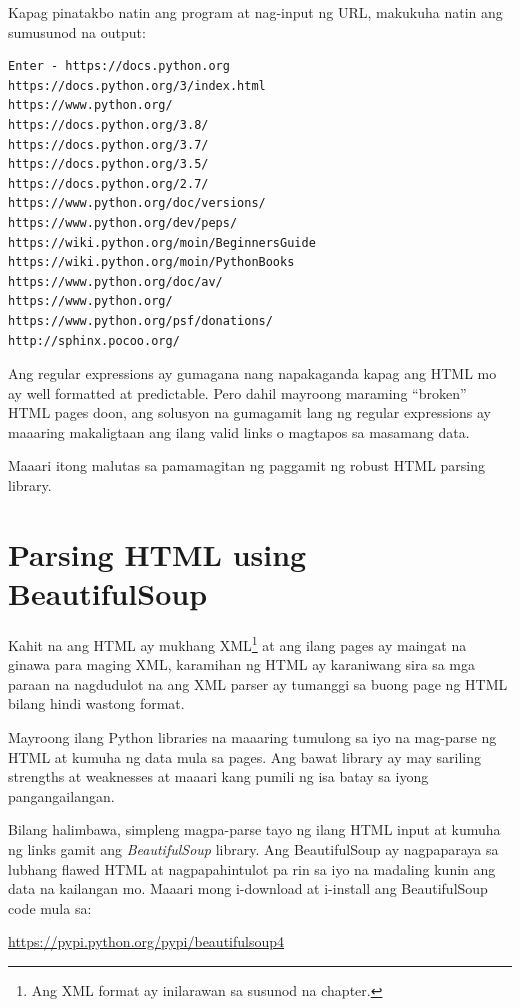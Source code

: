 \documentclass[10pt,]{book}
\begin{document}
Kapag pinatakbo natin ang program at nag-input ng URL, makukuha natin
ang sumusunod na output:

{\small
\begin{verbatim}
Enter - https://docs.python.org
https://docs.python.org/3/index.html
https://www.python.org/
https://docs.python.org/3.8/
https://docs.python.org/3.7/
https://docs.python.org/3.5/
https://docs.python.org/2.7/
https://www.python.org/doc/versions/
https://www.python.org/dev/peps/
https://wiki.python.org/moin/BeginnersGuide
https://wiki.python.org/moin/PythonBooks
https://www.python.org/doc/av/
https://www.python.org/
https://www.python.org/psf/donations/
http://sphinx.pocoo.org/
\end{verbatim}
}

Ang regular expressions ay gumagana nang napakaganda kapag ang HTML mo
ay well formatted at predictable. Pero dahil mayroong maraming
``broken'' HTML pages doon, ang solusyon na gumagamit lang ng regular
expressions ay maaaring makaligtaan ang ilang valid links o magtapos sa
masamang data.

Maaari itong malutas sa pamamagitan ng paggamit ng robust HTML parsing
library.

\section{Parsing HTML using
BeautifulSoup}\label{parsing-html-using-beautifulsoup}


Kahit na ang HTML ay mukhang XML\footnote{Ang XML format ay inilarawan
  sa susunod na chapter.} at ang ilang pages ay maingat na ginawa para
maging XML, karamihan ng HTML ay karaniwang sira sa mga paraan na
nagdudulot na ang XML parser ay tumanggi sa buong page ng HTML bilang
hindi wastong format.

Mayroong ilang Python libraries na maaaring tumulong sa iyo na mag-parse
ng HTML at kumuha ng data mula sa pages. Ang bawat library ay may
sariling strengths at weaknesses at maaari kang pumili ng isa batay sa
iyong pangangailangan.

Bilang halimbawa, simpleng magpa-parse tayo ng ilang HTML input at
kumuha ng links gamit ang \emph{BeautifulSoup} library. Ang
BeautifulSoup ay nagpaparaya sa lubhang flawed HTML at nagpapahintulot
pa rin sa iyo na madaling kunin ang data na kailangan mo. Maaari mong
i-download at i-install ang BeautifulSoup code mula sa:

\url{https://pypi.python.org/pypi/beautifulsoup4}
\end{document}

